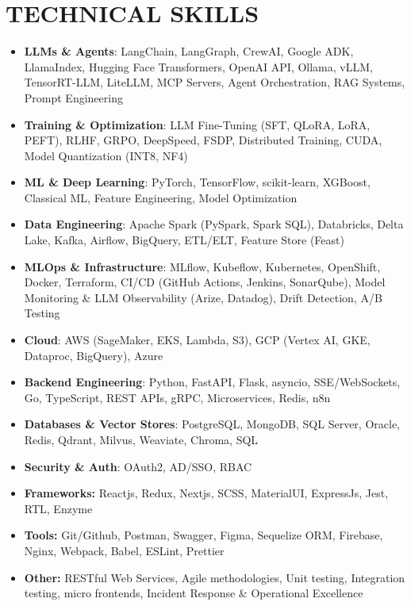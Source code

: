 \documentclass[a4paper]{article}
\begin{document}
\section*{TECHNICAL SKILLS}
\setlength{\arrayrulewidth}{1.2pt}
\begin{itemize}
\item \textbf{LLMs \& Agents}{: LangChain, LangGraph, CrewAI, Google ADK, LlamaIndex, Hugging Face Transformers, OpenAI API, Ollama, vLLM, TensorRT-LLM, LiteLLM, MCP Servers, Agent Orchestration, RAG Systems, Prompt Engineering}
\item \textbf{Training \& Optimization}{: LLM Fine-Tuning (SFT, QLoRA, LoRA, PEFT), RLHF, GRPO, DeepSpeed, FSDP, Distributed Training, CUDA, Model Quantization (INT8, NF4)}
\item \textbf{ML \& Deep Learning}{: PyTorch, TensorFlow, scikit-learn, XGBoost, Classical ML, Feature Engineering, Model Optimization}
\item \textbf{Data Engineering}{: Apache Spark (PySpark, Spark SQL), Databricks, Delta Lake, Kafka, Airflow, BigQuery, ETL/ELT, Feature Store (Feast)}
\item \textbf{MLOps \& Infrastructure}{: MLflow, Kubeflow, Kubernetes, OpenShift, Docker, Terraform, CI/CD (GitHub Actions, Jenkins, SonarQube), Model Monitoring \& LLM Observability (Arize, Datadog), Drift Detection, A/B Testing}
\item \textbf{Cloud}{: AWS (SageMaker, EKS, Lambda, S3), GCP (Vertex AI, GKE, Dataproc, BigQuery), Azure}
\item \textbf{Backend Engineering}{: Python, FastAPI, Flask, asyncio, SSE/WebSockets, Go, TypeScript, REST APIs, gRPC, Microservices, Redis, n8n}
\item \textbf{Databases \& Vector Stores}{: PostgreSQL, MongoDB, SQL Server, Oracle, Redis, Qdrant, Milvus, Weaviate, Chroma, SQL}
\item \textbf{Security \& Auth}{: OAuth2, AD/SSO, RBAC}
\item \textbf{Frameworks:} Reactjs, Redux, Nextjs, SCSS, MaterialUI, ExpressJs, Jest, RTL, Enzyme
\item \textbf{Tools:} Git/Github, Postman, Swagger, Figma, Sequelize ORM, Firebase, Nginx, Webpack, Babel, ESLint, Prettier
\item \textbf{Other:} RESTful Web Services, Agile methodologies, Unit testing, Integration testing, micro frontends, Incident Response \& Operational Excellence
\end{itemize}
\end{document}
